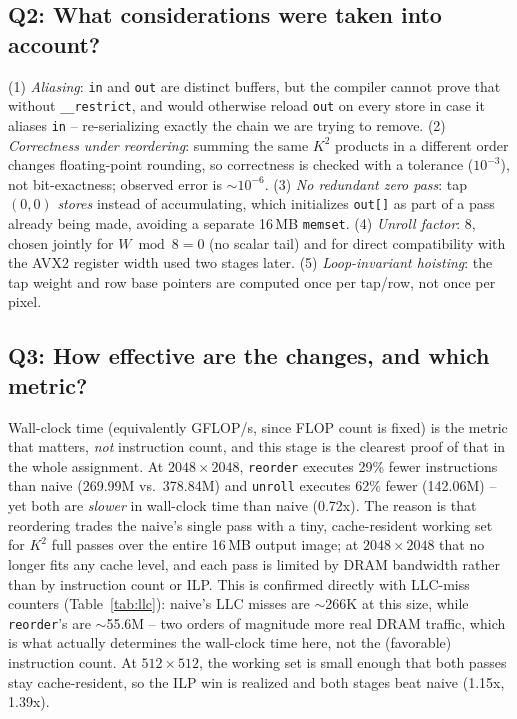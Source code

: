 \documentclass[11pt]{article}
\begin{document}
\subsection*{Q2: What considerations were taken into account?}
(1) \emph{Aliasing}: \texttt{in} and \texttt{out} are distinct buffers, but the compiler
cannot prove that without \texttt{\_\_restrict}, and would otherwise reload \texttt{out}
on every store in case it aliases \texttt{in} -- re-serializing exactly the chain we are
trying to remove. (2) \emph{Correctness under reordering}: summing the same $K^2$
products in a different order changes floating-point rounding, so correctness is
checked with a tolerance ($10^{-3}$), not bit-exactness; observed error is
$\sim 10^{-6}$. (3) \emph{No redundant zero pass}: tap $(0,0)$ \emph{stores} instead of
accumulating, which initializes \texttt{out[]} as part of a pass already being made,
avoiding a separate 16\,MB \texttt{memset}. (4) \emph{Unroll factor}: 8, chosen jointly
for $W\bmod 8{=}0$ (no scalar tail) and for direct compatibility with the AVX2 register
width used two stages later. (5) \emph{Loop-invariant hoisting}: the tap weight and row
base pointers are computed once per tap/row, not once per pixel.

\subsection*{Q3: How effective are the changes, and which metric?}
Wall-clock time (equivalently GFLOP/s, since FLOP count is fixed) is the metric that
matters, \emph{not} instruction count, and this stage is the clearest proof of that in
the whole assignment. At $2048{\times}2048$, \texttt{reorder} executes 29\% fewer
instructions than naive (269.99M vs.\ 378.84M) and \texttt{unroll} executes 62\% fewer
(142.06M) -- yet both are \emph{slower} in wall-clock time than naive (0.72x). The reason
is that reordering trades the naive's single pass with a tiny, cache-resident working
set for $K^2$ full passes over the entire 16\,MB output image; at $2048{\times}2048$
that no longer fits any cache level, and each pass is limited by DRAM bandwidth rather
than by instruction count or ILP. This is confirmed directly with LLC-miss counters
(Table~\ref{tab:llc}): naive's LLC misses are $\sim$266K at this size, while
\texttt{reorder}'s are $\sim$55.6M -- two orders of magnitude more real DRAM traffic,
which is what actually determines the wall-clock time here, not the (favorable)
instruction count. At $512{\times}512$, the working set is small enough that both passes
stay cache-resident, so the ILP win is realized and both stages beat naive (1.15x,
1.39x).
\end{document}
